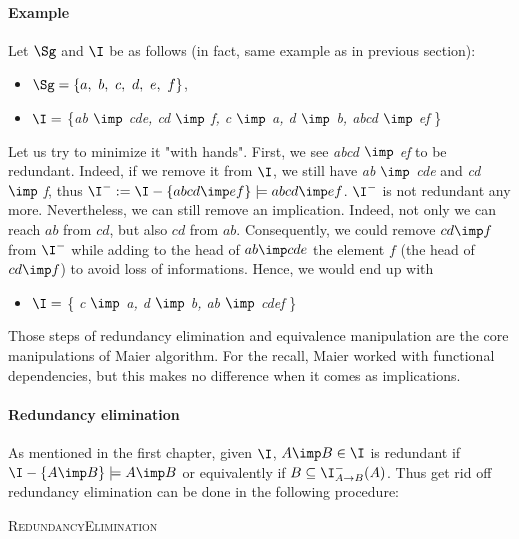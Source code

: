 \vspace{1.2em}

\paragraph{Example} Let $\Sg$ and $\I$ be as follows (in fact, same example as 
in previous section):
\begin{itemize}
	\item $\Sg = \{a, \ b, \ c, \ d, \ e, \ f \}$,
	\item $\I =$ \{\textit{ab $\imp$ cde, cd $\imp$ f, c $\imp$ a, d $\imp$ b, 
		abcd $\imp$ ef} \} 
\end{itemize}
\noindent Let us try to minimize it "with hands". First, we see \textit{abcd 
	$\imp$ ef} to be redundant. Indeed, if we remove it from $\I$, we still have
\textit{ab $\imp$ cde} and \textit{cd $\imp$ f}, thus $\I^{-} := \I - \{ abcd 
\imp ef \} \models abcd \imp ef$. $\I^{-}$ is not redundant any more. 
Nevertheless, we can still remove an implication. Indeed, not only we can reach 
$ab$ from $cd$, but also $cd$ from $ab$. Consequently, we could remove $cd \imp 
f$ from $\I^{-}$ while adding to the head of $ab \imp cde$ the element
$f$ (the head of $cd \imp f$) to avoid loss of informations. Hence, we 
would end up with 
\begin{itemize}
	\item $\I =$ \{ \textit{c $\imp$ a, d $\imp$ b, ab $\imp$ cdef} \}
\end{itemize}

\vspace{1.2em}

Those steps of redundancy elimination and equivalence manipulation are the core 
manipulations of Maier algorithm. For the recall, Maier worked with functional
dependencies, but this makes no difference when it comes as implications. 

\paragraph{Redundancy elimination} As mentioned in the first chapter, given 
$\I$, $A \imp B \in \I$ is redundant if $\I - \{ A \imp B \} \models A \imp B$ 
or equivalently if $B \subseteq \I^{-}_{A \rightarrow B}(A)$. Thus get rid off 
redundancy elimination can be done in the following procedure:

\begin{algorithm}
	
	\BlankLine
	\BlankLine
	
	
	\caption{\textsc{RedundancyElimination}}
	\label{alg:Maier-RE}	
\end{algorithm}

